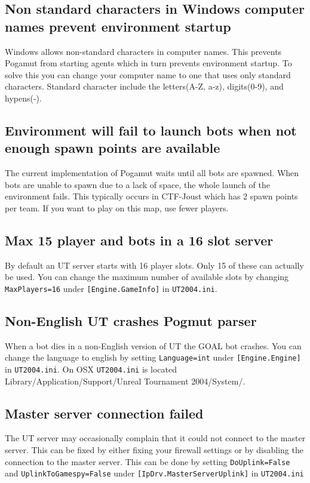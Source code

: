 \documentclass[11pt,a4paper]{article}
\begin{document}
\subsection{Non standard characters in Windows computer names prevent environment startup}

Windows allows non-standard characters in computer names. This prevents Pogamut from starting agents which in turn prevents environment startup. To solve this you can change your computer name to one that uses only standard characters. Standard character include the letters(A-Z, a-z), digits(0-9), and hypens(-).

\subsection{Environment will fail to launch bots when not enough spawn points are available}

The current implementation of Pogamut waits until all bots are spawned. When bots are unable to spawn due to a lack of space, the whole launch of the environment fails. This typically occurs in CTF-Joust which has 2 spawn points per team. If you want to play on this map, use fewer players.

\subsection{Max 15 player and bots in a 16 slot server}

By default an UT server starts with 16 player slots. Only 15 of these can actually be used. You can change the maximum number of available slots by changing \verb|MaxPlayers=16| under \verb|[Engine.GameInfo]| in \verb|UT2004.ini|.

\subsection{Non-English UT crashes Pogmut parser}

When a bot dies in a non-English version of UT the GOAL bot crashes. You can change the language to english by setting \verb|Language=int| under \verb|[Engine.Engine]| in \verb|UT2004.ini|. On OSX \verb|UT2004.ini| is located Library/Application/Support/Unreal Tournament 2004/System/.

\subsection{Master server connection failed}

The UT server may occasionally complain that it could not connect to the master server. This can be fixed by either fixing your firewall settings or by disabling the connection to the master server. This can be done by setting \verb|DoUplink=False| and  \verb|UplinkToGamespy=False| under \verb|[IpDrv.MasterServerUplink]| in \verb|UT2004.ini|


\end{document}
